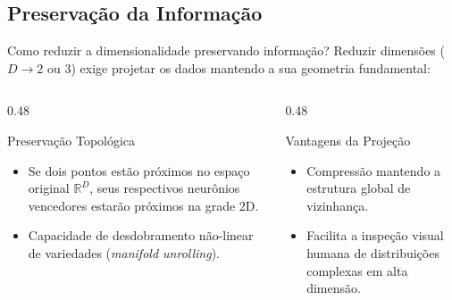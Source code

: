 \documentclass[aspectratio=169]{beamer}
\begin{document}
	\subsection{Preservação da Informação}
	\begin{frame}{Como reduzir a dimensionalidade preservando informação?}
		Reduzir dimensões ($D \to 2$ ou $3$) exige projetar os dados mantendo a sua geometria fundamental:
		
		\begin{columns}[T]
			\begin{column}{0.48\textwidth}
				\begin{block}{Preservação Topológica}
					\begin{itemize}
						\item Se dois pontos estão próximos no espaço original $\mathbb{R}^D$, seus respectivos neurônios vencedores estarão próximos na grade 2D.
						\item Capacidade de desdobramento não-linear de variedades (\textit{manifold unrolling}).
					\end{itemize}
				\end{block}
			\end{column}
			
			\begin{column}{0.48\textwidth}
				\begin{block}{Vantagens da Projeção}
					\begin{itemize}
						\item Compressão mantendo a estrutura global de vizinhança.
						\item Facilita a inspeção visual humana de distribuições complexas em alta dimensão.
					\end{itemize}
				\end{block}
			\end{column}
		\end{columns}
	\end{frame}
	
\end{document}
